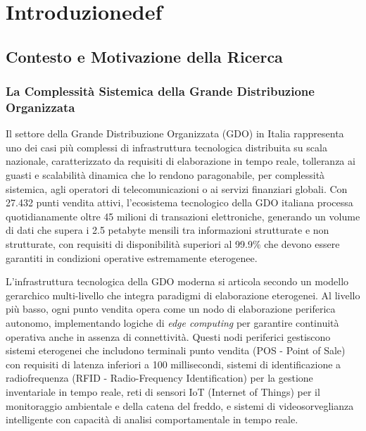 \chapter{Introduzionedef}
\label{cap1_introduction}

\section{Contesto e Motivazione della Ricerca}

\subsection{La Complessità Sistemica della Grande Distribuzione Organizzata}

Il settore della Grande Distribuzione Organizzata (GDO) in Italia rappresenta uno dei casi più complessi di infrastruttura tecnologica distribuita su scala nazionale, caratterizzato da requisiti di elaborazione in tempo reale, tolleranza ai guasti e scalabilità dinamica che lo rendono paragonabile, per complessità sistemica, agli operatori di telecomunicazioni o ai servizi finanziari globali. Con 27.432 punti vendita attivi\autocite{istat2024}, l'ecosistema tecnologico della GDO italiana processa quotidianamente oltre 45 milioni di transazioni elettroniche, generando un volume di dati che supera i 2.5 petabyte mensili tra informazioni strutturate e non strutturate, con requisiti di disponibilità superiori al 99.9\% che devono essere garantiti in condizioni operative estremamente eterogenee.

L'infrastruttura tecnologica della GDO moderna si articola secondo un modello gerarchico multi-livello che integra paradigmi di elaborazione eterogenei. Al livello più basso, ogni punto vendita opera come un nodo di elaborazione periferica autonomo, implementando logiche di \textit{edge computing} per garantire continuità operativa anche in assenza di connettività. Questi nodi periferici gestiscono sistemi eterogenei che includono terminali punto vendita (POS - Point of Sale) con requisiti di latenza inferiori a 100 millisecondi, sistemi di identificazione a radiofrequenza (RFID - Radio-Frequency Identification) per la gestione inventariale in tempo reale, reti di sensori IoT (Internet of Things) per il monitoraggio ambientale e della catena del freddo, e sistemi di videosorveglianza intelligente con capacità di analisi comportamentale in tempo reale.


